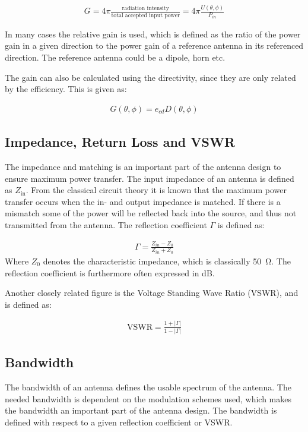 \begin{align}
  G = 4 \pi \frac{\text{radiation intensity}}{\text{total accepted input power}} = 4 \pi \frac{U(\theta,\phi)}{P_{in}} 
\end{align}

In many cases the relative gain is used, which is defined as the ratio of the power gain in a given direction to the power gain of a reference antenna in its referenced direction. The reference antenna could be a dipole, horn etc. 

The gain can also be calculated using the directivity, since they are only related by the efficiency. This is given as: 

\begin{align}
  G(\theta,\phi) = e_{cd}D(\theta, \phi)
\end{align}

\subsection{Impedance, Return Loss and VSWR}
The impedance and matching is an important part of the antenna design to ensure maximum power transfer. The input impedance of an antenna is defined as $Z_{\text{in}}$. From the classical circuit theory it is known that the maximum power transfer occurs when the in- and output impedance is matched. If there is a mismatch some of the power will be reflected back into the source, and thus not transmitted from the antenna. The reflection coefficient $\Gamma$ is defined as:

\begin{align}
  \Gamma = \frac{Z_{in}-Z_0}{Z_{in}+Z_0}
\end{align}
Where $Z_0$ denotes the characteristic impedance, which is classically \SI{50}{\ohm}. The reflection coefficient is furthermore often expressed in \si{dB}. 

Another closely related figure is the Voltage Standing Wave Ratio (VSWR), and is defined as: 

\begin{align}
  \text{VSWR} = \frac{1+|\Gamma|}{1-|\Gamma|}
\end{align}

\subsection{Bandwidth}
The bandwidth of an antenna defines the usable spectrum of the antenna. The needed bandwidth is dependent on the modulation schemes used, which makes the bandwidth an important part of the antenna design. The bandwidth is defined with respect to a given reflection coefficient or VSWR.

